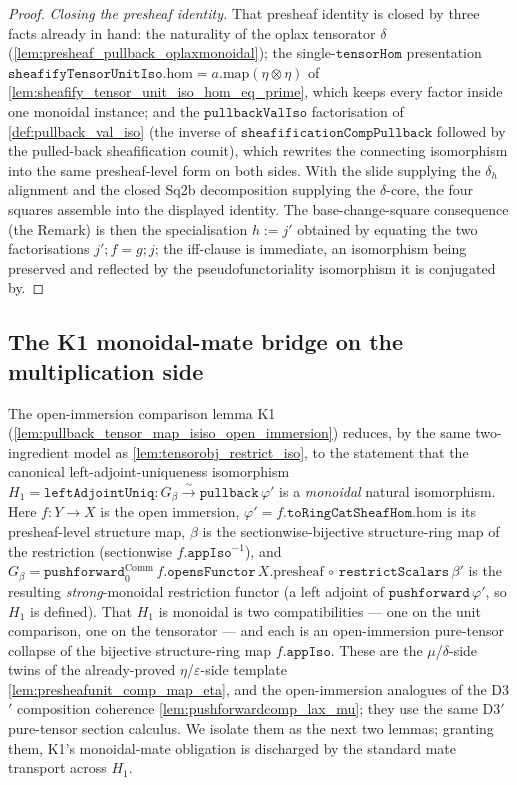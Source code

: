\begin{proof}
  \emph{Closing the presheaf identity.} That presheaf identity is closed by three facts
  already in hand: the naturality of the oplax tensorator \(\delta\)
  (\cref{lem:presheaf_pullback_oplaxmonoidal}); the single-\(\mathtt{tensorHom}\)
  presentation \(\mathtt{sheafifyTensorUnitIso}.\mathrm{hom} = a.\mathrm{map}(\eta\otimes\eta)\)
  of \cref{lem:sheafify_tensor_unit_iso_hom_eq_prime}, which keeps every factor inside one
  monoidal instance; and the \(\mathtt{pullbackValIso}\) factorisation of
  \cref{def:pullback_val_iso} (the inverse of \(\mathtt{sheafificationCompPullback}\) followed
  by the pulled-back sheafification counit), which rewrites the connecting isomorphism into
  the same presheaf-level form on both sides. With the slide supplying the \(\delta_h\)
  alignment and the closed Sq2b decomposition supplying the \(\delta\)-core, the four squares
  assemble into the displayed identity. The base-change-square consequence (the Remark) is
  then the specialisation \(h := j'\) obtained by equating the two factorisations
  \(j' \mathbin{;} f = g \mathbin{;} j\); the iff-clause is immediate, an isomorphism being
  preserved and reflected by the pseudofunctoriality isomorphism it is conjugated by.
\end{proof}

\subsection{The K1 monoidal-mate bridge on the multiplication side}

The open-immersion comparison lemma K1 (\cref{lem:pullback_tensor_map_isiso_open_immersion})
reduces, by the same two-ingredient model as \cref{lem:tensorobj_restrict_iso}, to the
statement that the canonical left-adjoint-uniqueness isomorphism
\(H_1 = \mathtt{leftAdjointUniq} : G_\beta \xrightarrow{\sim} \mathtt{pullback}\,\varphi'\) is a
\emph{monoidal} natural isomorphism. Here \(f : Y \to X\) is the open immersion,
\(\varphi' = f.\mathtt{toRingCatSheafHom}.\mathrm{hom}\) is its presheaf-level structure map,
\(\beta\) is the sectionwise-bijective structure-ring map of the restriction (sectionwise
\(f.\mathtt{appIso}^{-1}\)), and
\(G_\beta = \mathtt{pushforward}_0^{\mathrm{Comm}}\,f.\mathtt{opensFunctor}\,X.\mathrm{presheaf}
\,\circ\, \mathtt{restrictScalars}\,\beta'\) is the resulting \emph{strong}-monoidal restriction
functor (a left adjoint of \(\mathtt{pushforward}\,\varphi'\), so \(H_1\) is defined). That \(H_1\)
is monoidal is two compatibilities --- one on the unit comparison, one on the tensorator --- and
each is an open-immersion pure-tensor collapse of the bijective structure-ring map
\(f.\mathtt{appIso}\). These are the $\mu$/$\delta$-side twins of the already-proved $\eta$/$\varepsilon$-side
template \cref{lem:presheafunit_comp_map_eta}, and the open-immersion analogues of the D3$'$
composition coherence \cref{lem:pushforwardcomp_lax_mu}; they use the same D3$'$ pure-tensor
section calculus. We isolate them as the next two lemmas; granting them, K1's
monoidal-mate obligation is discharged by the standard mate transport across \(H_1\).

